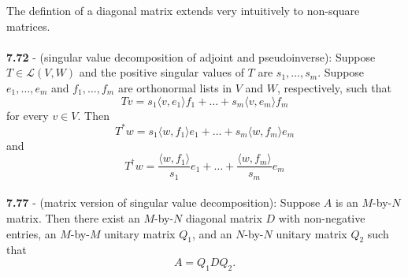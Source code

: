 \documentclass{article}
\theoremstyle{definition}
\begin{document}
The defintion of a diagonal matrix extends very intuitively to non-square matrices. \\ \\
\textbf{7.72} - (singular value decomposition of adjoint and pseudoinverse): Suppose $T \in \mathcal{L}(V, W)$ and the positive singular values of $T$ are $s_1, \dots, s_m$. Suppose $e_1, \dots, e_m$ and $f_1, \dots, f_m$ are orthonormal lists in $V$ and $W$, respectively, such that $$Tv = s_1 \langle v, e_1 \rangle f_1 + \dots + s_m \langle v, e_m \rangle f_m$$ for every $v \in V$. Then $$T^*w = s_1 \langle w, f_1 \rangle e_1 + \dots + s_m \langle w, f_m \rangle e_m$$ and $$T^\dagger w = \frac{\langle w, f_1 \rangle}{s_1} e_1 + \dots + \frac{\langle w, f_m \rangle}{s_m} e_m$$ \\
\textbf{7.77} - (matrix version of singular value decomposition): Suppose $A$ is an $M$-by-$N$ matrix. Then there exist an $M$-by-$N$ diagonal matrix $D$ with non-negative entries, an $M$-by-$M$ unitary matrix $Q_1$, and an $N$-by-$N$ unitary matrix $Q_2$ such that $$A = Q_1 D Q_2.$$
\end{document}
